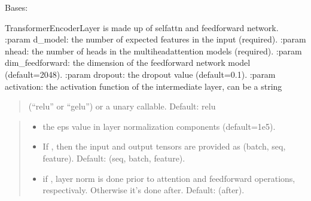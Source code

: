 \documentclass[letterpaper,10pt,english]{sphinxmanual}
\begin{document}
\begin{fulllineitems}
\label{\detokenize{beyondml.pt.layers:beyondml.pt.layers.MaskedTransformerEncoderLayer.MaskedTransformerEncoderLayer}}
\pysigstartsignatures
{}
\pysigstopsignatures
\sphinxAtStartPar
Bases: 

\sphinxAtStartPar
TransformerEncoderLayer is made up of self\sphinxhyphen{}attn and feedforward network.
:param d\_model: the number of expected features in the input (required).
:param nhead: the number of heads in the multiheadattention models (required).
:param dim\_feedforward: the dimension of the feedforward network model (default=2048).
:param dropout: the dropout value (default=0.1).
:param activation: the activation function of the intermediate layer, can be a string
\begin{quote}

\sphinxAtStartPar
(“relu” or “gelu”) or a unary callable. Default: relu
\end{quote}
\begin{quote}\begin{description}
\begin{itemize}
\item {} 
\sphinxAtStartPar
{} \textendash{} the eps value in layer normalization components (default=1e\sphinxhyphen{}5).

\item {} 
\sphinxAtStartPar
{} \textendash{} If , then the input and output tensors are provided
as (batch, seq, feature). Default:  (seq, batch, feature).

\item {} 
\sphinxAtStartPar
{} \textendash{} if , layer norm is done prior to attention and feedforward
operations, respectivaly. Otherwise it’s done after. Default:  (after).


\end{itemize}
\end{description}
\end{quote}
\end{fulllineitems}
\end{document}
